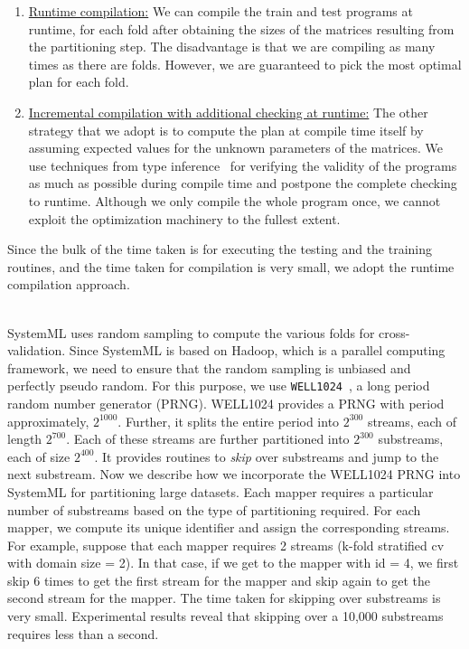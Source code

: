 \documentclass{vldb}
\newcommand{\topic}[1]{\par \smallskip \smallskip \noindent{\bf \uline{#1}}}
\begin{document}
\begin{enumerate}
\item{\underline{Runtime compilation:}}
We can compile the train and test programs at runtime, for each fold after
obtaining the sizes of the matrices resulting from the partitioning step. The
disadvantage is that we are compiling as many times as there are folds. However,
we are guaranteed to pick the most optimal plan for each fold.
\item{\uline{Incremental compilation with additional checking at runtime:}}
The other strategy that we adopt is to compute the plan at compile time itself
by assuming expected values for the unknown parameters of the matrices. We use
techniques from type inference~\cite{} for verifying the validity of the
programs as much as possible during compile time and postpone the complete
checking to runtime. Although we only compile the whole program once, we cannot
exploit the optimization machinery to the fullest extent.
\end{enumerate}

Since the bulk of the time taken is for executing the testing and the training
routines, and the time taken for compilation is very small, we adopt the runtime
compilation approach.


\topic{Pseudo random sampling on Hadoop}\\
SystemML uses random sampling to compute the various folds for cross-validation.
Since SystemML is based on Hadoop, which is a parallel computing framework, we
need to ensure that the random sampling is unbiased and perfectly pseudo random.
For this purpose, we use {\tt WELL1024}~\cite{L'Ecuyer:1990:RNS:84537.84555}, a
long period random number generator (PRNG). WELL1024 provides a PRNG with period
approximately, $2^{1000}$. Further, it splits the entire period into $2^{300}$
streams, each of length $2^{700}$. Each of these streams are further partitioned
into $2^{300}$ substreams, each of size $2^{400}$.  It provides routines to {\em
skip} over substreams and jump to the next substream.  Now we describe how we
incorporate the WELL1024 PRNG into SystemML for partitioning large datasets.
Each mapper requires a particular number of substreams based on the type of
partitioning required. For each mapper, we compute its unique identifier and
assign the corresponding streams. For example, suppose that each mapper requires
2 streams (k-fold stratified cv with domain size = 2). In that case, if we get
to the mapper with id = 4, we first skip 6 times to get the first stream for the
mapper and skip again to get the second stream for the mapper. The time taken
for skipping over substreams is very small. Experimental results reveal that
skipping over a 10,000 substreams requires less than a second.
\end{document}
